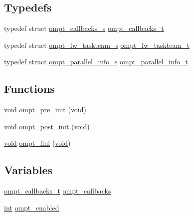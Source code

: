 \subsection*{Typedefs}
\begin{DoxyCompactItemize}
\item 
typedef struct \hyperlink{structompt__callbacks__s}{ompt\-\_\-callbacks\-\_\-s} \hyperlink{ompt-internal_8h_a7d8ca0a286bcf8192b571a8916082fa6}{ompt\-\_\-callbacks\-\_\-t}
\item 
typedef struct \hyperlink{structompt__lw__taskteam__s}{ompt\-\_\-lw\-\_\-taskteam\-\_\-s} \hyperlink{ompt-internal_8h_a9efdb170346e988130296a7bb0cb861c}{ompt\-\_\-lw\-\_\-taskteam\-\_\-t}
\item 
typedef struct \hyperlink{structompt__parallel__info__s}{ompt\-\_\-parallel\-\_\-info\-\_\-s} \hyperlink{ompt-internal_8h_a53c904221793d45e78848f5ae77d5a60}{ompt\-\_\-parallel\-\_\-info\-\_\-t}
\end{DoxyCompactItemize}
\subsection*{Functions}
\begin{DoxyCompactItemize}
\item 
\hyperlink{ittnotify__static_8h_af941d56e55e3c5465135b60c4d6343ed}{void} \hyperlink{ompt-internal_8h_a4debaede8205553ba62eeefc633877a0}{ompt\-\_\-pre\-\_\-init} (\hyperlink{ittnotify__static_8h_af941d56e55e3c5465135b60c4d6343ed}{void})
\item 
\hyperlink{ittnotify__static_8h_af941d56e55e3c5465135b60c4d6343ed}{void} \hyperlink{ompt-internal_8h_a477b2e3a5d4861223163b164c3c6da41}{ompt\-\_\-post\-\_\-init} (\hyperlink{ittnotify__static_8h_af941d56e55e3c5465135b60c4d6343ed}{void})
\item 
\hyperlink{ittnotify__static_8h_af941d56e55e3c5465135b60c4d6343ed}{void} \hyperlink{ompt-internal_8h_afcbc1227f787921097c068d7374b1c20}{ompt\-\_\-fini} (\hyperlink{ittnotify__static_8h_af941d56e55e3c5465135b60c4d6343ed}{void})
\end{DoxyCompactItemize}
\subsection*{Variables}
\begin{DoxyCompactItemize}
\item 
\hyperlink{ompt-internal_8h_a7d8ca0a286bcf8192b571a8916082fa6}{ompt\-\_\-callbacks\-\_\-t} \hyperlink{ompt-internal_8h_a84a29d89cef82c7c38e1ee1f70ec994f}{ompt\-\_\-callbacks}
\item 
\hyperlink{ittnotify__static_8h_a8b8dcd723308a8cb5d84277c7a3fff70}{int} \hyperlink{ompt-internal_8h_a966b31b6d05f79f5495f8d8e71732f68}{ompt\-\_\-enabled}
\end{DoxyCompactItemize}


